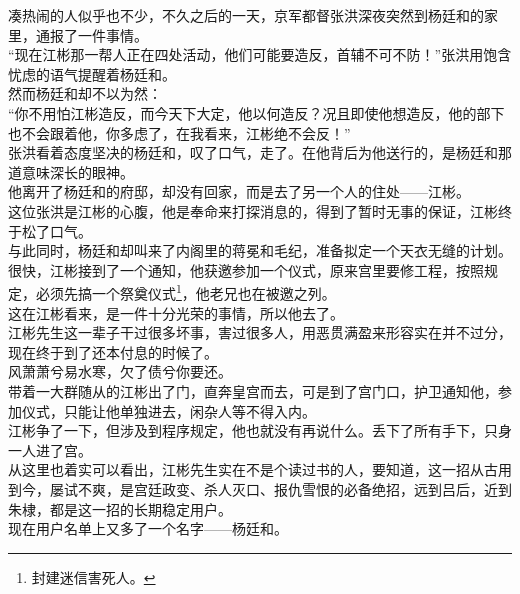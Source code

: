 \begin{multicols}{\theparacolNo}
凑热闹的人似乎也不少，不久之后的一天，京军都督张洪深夜突然到杨廷和的家里，通报了一件事情。\\

“现在江彬那一帮人正在四处活动，他们可能要造反，首辅不可不防！”张洪用饱含忧虑的语气提醒着杨廷和。\\

然而杨廷和却不以为然：\\

“你不用怕江彬造反，而今天下大定，他以何造反？况且即使他想造反，他的部下也不会跟着他，你多虑了，在我看来，江彬绝不会反！”\\

张洪看着态度坚决的杨廷和，叹了口气，走了。在他背后为他送行的，是杨廷和那道意味深长的眼神。\\

他离开了杨廷和的府邸，却没有回家，而是去了另一个人的住处——江彬。\\

这位张洪是江彬的心腹，他是奉命来打探消息的，得到了暂时无事的保证，江彬终于松了口气。\\

与此同时，杨廷和却叫来了内阁里的蒋冕和毛纪，准备拟定一个天衣无缝的计划。\\

很快，江彬接到了一个通知，他获邀参加一个仪式，原来宫里要修工程，按照规定，必须先搞一个祭奠仪式\footnote{封建迷信害死人。}，他老兄也在被邀之列。\\

这在江彬看来，是一件十分光荣的事情，所以他去了。\\

江彬先生这一辈子干过很多坏事，害过很多人，用恶贯满盈来形容实在并不过分，现在终于到了还本付息的时候了。\\

风萧萧兮易水寒，欠了债兮你要还。\\

带着一大群随从的江彬出了门，直奔皇宫而去，可是到了宫门口，护卫通知他，参加仪式，只能让他单独进去，闲杂人等不得入内。\\

江彬争了一下，但涉及到程序规定，他也就没有再说什么。丢下了所有手下，只身一人进了宫。\\

从这里也着实可以看出，江彬先生实在不是个读过书的人，要知道，这一招从古用到今，屡试不爽，是宫廷政变、杀人灭口、报仇雪恨的必备绝招，远到吕后，近到朱棣，都是这一招的长期稳定用户。\\

现在用户名单上又多了一个名字——杨廷和。\\


\end{multicols}
